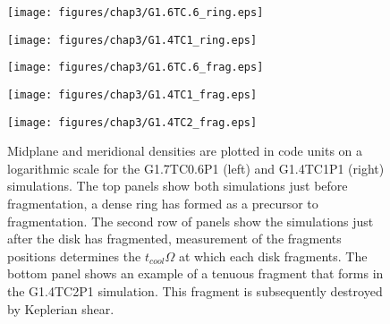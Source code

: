 \begin{figure}[p]
\begin{minipage}{0.5\linewidth}
\centering
\texttt{[image: figures/chap3/G1.6TC.6\_ring.eps]}
\end{minipage}
\hspace{0.25in}
\begin{minipage}{0.5\linewidth}
\centering
\texttt{[image: figures/chap3/G1.4TC1\_ring.eps]}
\end{minipage}
\vspace{0.2in}

\begin{minipage}{0.5\linewidth}
\centering
\texttt{[image: figures/chap3/G1.6TC.6\_frag.eps]}
\end{minipage}
\hspace{0.25in}
\begin{minipage}{0.5\linewidth}
\centering
\texttt{[image: figures/chap3/G1.4TC1\_frag.eps]}
\end{minipage}
\vspace{0.2in}

\centering
\begin{minipage}{0.5\linewidth}
\centering
\texttt{[image: figures/chap3/G1.4TC2\_frag.eps]}
\end{minipage}
\caption[Midplane and meridional densities of fragmenting disks]{Midplane and meridional densities are plotted in code units on a logarithmic scale for the G1.7TC0.6P1 (left) and G1.4TC1P1 (right) simulations. The top panels show both simulations just before fragmentation, a dense ring has formed as a precursor to fragmentation. The second row of panels show the simulations just after the disk has fragmented, measurement of the fragments positions determines the $t_{cool}\Omega$ at which each disk fragments. The bottom panel shows an example of a tenuous fragment that forms in the G1.4TC2P1 simulation. This fragment is subsequently destroyed by Keplerian shear.}
\label{fig:IC:gammaden}
\end{figure}

